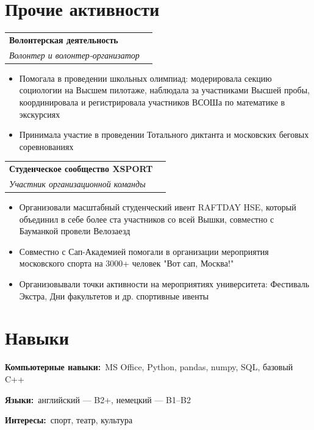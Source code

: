 \documentclass[a4paper, 12pt]{article}
\newcommand{\resumeSubheading}[4]{
  \vspace{3pt}
  \begin{tabularx}{\textwidth}{X r}
    \textbf{#1} & {\small\color{sub-grey} #2} \\
    \textit{\small #3} & {\small\color{sub-grey} #4} \\
  \end{tabularx}
  \vspace{1pt}
}
\newcommand{\resumeItemListStart}{\begin{itemize}[leftmargin=5.5mm, itemsep=3pt, topsep=4pt, parsep=0pt, label=\textcolor{accent-light}{\small\textbullet}]}
\newcommand{\resumeItemListEnd}{\end{itemize}\vspace{2pt}}
\newcommand{\resumeItem}[1]{\item \small #1}
\newcommand{\skillRow}[2]{
  \par\noindent\textbf{\small #1:}~\small #2\par\vspace{5pt}
}
\begin{document}
\section{Прочие активности}

\resumeSubheading
  {Волонтерская деятельность}{}
  {Волонтер и волонтер-организатор}{}
\resumeItemListStart
  \resumeItem{Помогала в проведении школьных олимпиад: модерировала секцию социологии на Высшем пилотаже, наблюдала за участниками Высшей пробы, координировала и регистрировала участников ВСОШа по математике в экскурсиях}
    \resumeItem{Принимала участие в проведении Тотального диктанта и московских беговых соревнованиях}

\resumeItemListEnd

\resumeSubheading
  {Студенческое сообщество XSPORT}{}
  {Участник организационной команды}{}
\resumeItemListStart
  \resumeItem{Организовали масштабный студенческий ивент RAFTDAY HSE, который объединил в себе более ста участников со всей Вышки, совместно с Бауманкой провели Велозаезд}
  \resumeItem{Совместно с Сап-Академией помогали в организации мероприятия московского спорта на 3000+ человек "Вот сап, Москва!"}
  \resumeItem{Организовывали точки активности на мероприятиях университета: Фестиваль Экстра, Дни факультетов и др. спортивные ивенты}
\resumeItemListEnd

\section{Навыки}

\skillRow{Компьютерные навыки}{MS Office, Python, pandas, numpy, SQL, базовый C++}
\skillRow{Языки}{английский — B2+, немецкий — B1--B2}
\skillRow{Интересы}{спорт, театр, культура}
\end{document}
